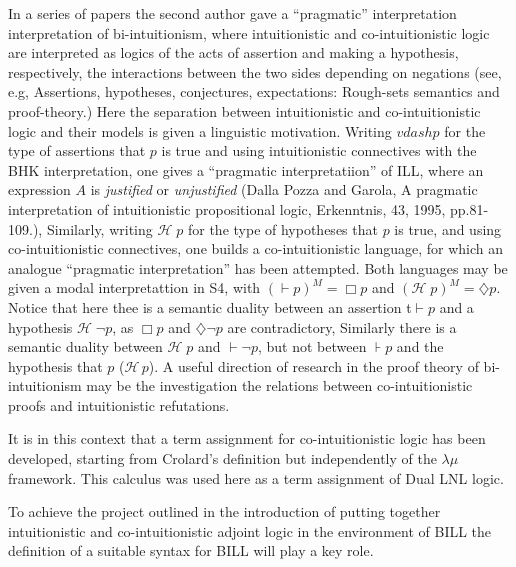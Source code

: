 In a series of papers the second author gave a ``pragmatic''
interpretation interpretation of bi-intuitionism, where intuitionistic
and co-intuitionistic logic are interpreted as logics of the acts of
assertion and making a hypothesis, respectively, the interactions
between the two sides depending on negations (see, e.g,
\cite{Bellin:2014} Assertions, hypotheses, conjectures, expectations:
Rough-sets semantics and proof-theory.)  Here the separation between 
intuitionistic and co-intuitionistic logic and their models is given a 
linguistic motivation. Writing  $vdash p$ for the type of assertions that $p$ 
is true and using intuitionistic connectives with the BHK interpretation, one gives 
a ``pragmatic interpretatiion'' of ILL, where an expression $A$ is \emph{justified} 
or \emph{unjustified} (Dalla Pozza and Garola,  
A pragmatic interpretation of intuitionistic propositional logic, Erkenntnis, 43, 1995, pp.81-109.), 
Similarly, writing $\mathcal{H}\;  p$ for the type of hypotheses that $p$ is true,  and  
using co-intuitionistic connectives, one builds a co-intuitionistic language, for which 
an analogue ``pragmatic interpretation'' has been attempted.  Both languages may 
be given a modal interpretattion in S4, with $(\vdash p)^M = \Box p$
and  $(\mathcal{H}\;  p)^M = \diamondsuit p$. Notice that  here thee is a semantic duality between
an assertion t$\vdash p$  and a hypothesis $\mathcal{H}\; \neg p$, as $\Box p$ and 
$\diamondsuit \neg p$ are contradictory, Similarly there is a semantic duality between 
$\mathcal{H}\;  p$ and $\vdash \neg p$, but not between $\assert p$ 
and the hypothesis that $p$ ($\mathcal{H}\, p$). A useful direction of research in the 
proof theory of bi-intuitionism may be the investigation the relations between co-intuitionistic
proofs and intuitionistic refutations. 

It is in this context that a term assignment for co-intuitionistic  logic 
has been developed, starting from Crolard's definition but independently
of the $\lambda\mu$ framework. This calculus was used
here as a term assignment of Dual LNL logic.


To achieve the project outlined in the introduction of putting
together intuitionistic and co-intuitionistic adjoint logic in the
environment of BILL the definition of a suitable syntax for BILL will
play a key role.



